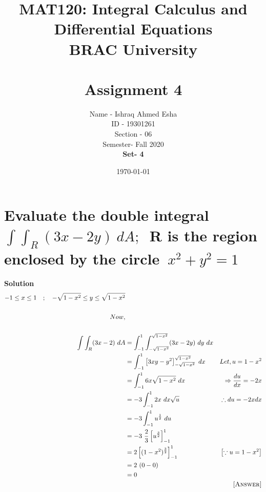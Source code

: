 \documentclass[12pt]{article}
\begin{document}
\title{MAT120: Integral Calculus and
Differential Equations \\
BRAC University \\\\
\textbf{Assignment 4}}

\author{Name - Ishraq Ahmed Esha \\ ID - 19301261 \\ Section - 06 \\ Semester- Fall 2020 \\ \textbf{Set- 4}}
\date{\today}
\maketitle
\pagebreak



\section{Evaluate the double integral $\int\int_R(3x-2y)\ dA;$\ R is the region enclosed by the circle\ $x^2+y^2=1$}



\textbf{Solution}
\begin{align*}
    -1\leq x\leq1\quad ;\quad -\sqrt{1-x^2}\leq y\leq \sqrt{1-x^2}\\\\
    Now,\\\\
    \int\int_R(3x-2)\ dA &=\int_{-1}^{1}\int_{-\sqrt{1-x^2}}^{\sqrt{1-x^2}}(3x-2y)\ dy\ dx\\
    &=\int_{-1}^{1}\left[3xy-y^2\right]_{-\sqrt{1-x^2}}^{\sqrt{1-x^2}}\ dx & Let, u=1-x^2 \\
    &=\int_{-1}^{1}6x\sqrt{1-x^2}\ dx & \Rightarrow \frac{du}{dx}=-2x\\
    &=-3\int_{-1}^{1}2x\ dx \sqrt{u} & \therefore du=-2xdx\\
    &=-3\int_{-1}^{1}u^{\frac{1}{2}}\ du\\
    &=-3\ \frac{2}{3}\left[u^{\frac{3}{2}}\right]_{-1}^{1}\\
    &=2\left[(1-x^2)^{\frac{3}{2}}\right]_{-1}^{1} & \left[\because u=1-x^2\right]\\
    &=2\ (0-0)\\
    &=0\\
    & & \textsc{[Answer]}
\end{align*}
\pagebreak
\end{document}
